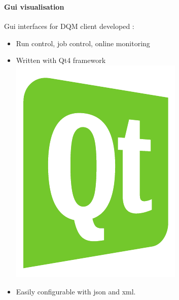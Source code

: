 \documentclass[8pt]{beamer}
\begin{document}
  \begin{frame}
    \frametitle{\secname}
    \framesubtitle{Gui visualisation}
        
	  Gui interfaces for DQM client developed :
            
      \begin{itemize}
        \item Run control, job control, online monitoring
        \item Written with Qt4 framework     \includegraphics[width=.03\textwidth]{logo/Qt_CMYK_color}
        \item Easily configurable with json and xml.
      \end{itemize}
    
      \end{frame} 
      
\end{document}
